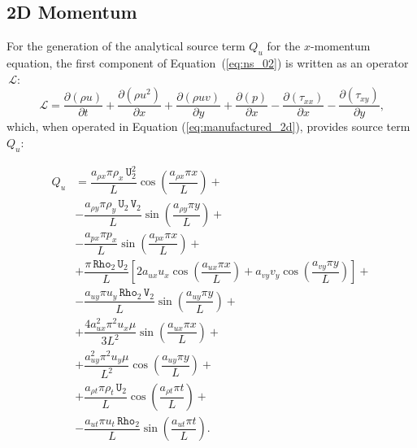 \documentclass[10pt]{article}
\newcommand{\Diff}[2] {\dfrac{\partial( #1)}{\partial #2}}
\newcommand{\Rho}{\,\mathtt{Rho}}
\newcommand{\U}{\,\mathtt{U}}
\newcommand{\V}{\,\mathtt{V}}
\newcommand{\Lo}{\,\mathcal{L}}
\begin{document}
\subsection{2D Momentum}

For the generation of the analytical source term $Q_u$ for the $x$-momentum equation, the first component of Equation~(\ref{eq:ns_02}) is written as an  operator $\Lo$:
\begin{equation*}
 \Lo= \Diff{\rho u}{t} +\Diff{\rho u^2 }{x}+\Diff{\rho uv}{y} +\Diff{p}{x}-\Diff{\tau_{xx}}{x}-\Diff{\tau_{xy}}{y},
\end{equation*}
which, when operated in Equation (\ref{eq:manufactured_2d}), provides source term $Q_{u}$:

\begin{equation}
 \begin{split}
Q_u &=  \dfrac{a_{\rho x} \pi \rho_x \U_2^2}{L}\cos\left(\dfrac{a_{\rho x} \pi x}{L}\right)+\\
&- \dfrac{a_{\rho y} \pi \rho_y \U_2 \V_2}{L}\sin\left(\dfrac{a_{\rho y} \pi y}{L}\right)+\\
&-\dfrac{a_{px} \pi p_x }{L}\sin\left(\dfrac{a_{px} \pi x}{L}\right)+\\
&+\dfrac{\pi \Rho_2 \U_2}{L}\left[2 a_{ux} u_x \cos\left(\dfrac{a_{ux} \pi x}{L}\right)+a_{vy} v_y \cos\left(\dfrac{a_{vy} \pi y}{L}\right)\right]+\\
&-\dfrac{a_{uy} \pi u_y \Rho_2 \V_2 }{L}\sin\left(\dfrac{a_{uy} \pi y}{L}\right)+\\
&+\dfrac{4a_{ux}^2 \pi^2 u_x \mu}{3L^2}\sin\left(\dfrac{a_{ux} \pi x}{L}\right) +\\
&+\dfrac{a_{uy}^2 \pi^2 u_y \mu}{L^2}\cos\left(\dfrac{a_{uy} \pi y}{L}\right)+\\
&+ \dfrac{ a_{\rho t} \pi \rho_t \U_2}{L}\cos\left(\dfrac{a_{\rho t} \pi t}{L}\right)+\\
&-\dfrac{a_{ut} \pi u_t  \Rho_2 }{L}\sin\left(\dfrac{a_{ut} \pi t}{L}\right).
 \end{split}
\end{equation}
\end{document}
